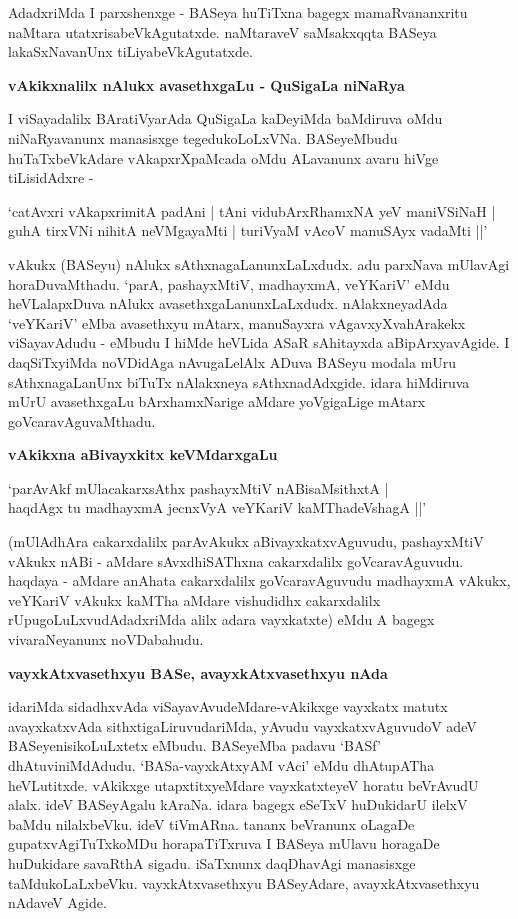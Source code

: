 AdadxriMda I parxshenxge - BASeya huTiTxna bagegx mamaRvananxritu naMtara utatxrisa\-beVkAgutatxde. naMta\-raveV saMsakxqqta BASeya lakaSxNavanUnx tiLiyabeVkAgutatxde.

{\bigskip
\noindent
{\large\bf vAkikxnalilx nAlukx avasethxgaLu - QuSigaLa niNaRya}}\label{page8}
\medskip

\noindent
I viSayadalilx BAratiVyarAda QuSigaLa kaDeyiMda baMdiruva oMdu niNaRyavanunx mana\-sisxge tegedu\-koLoLxVNa. BASeyeMbudu huTaTxbeVkAdare vAkapxrXpaMcada oMdu ALavanunx avaru hiVge tiLisi\-dAdxre -

\begin{shloka}
`catAvxri vAkapxrimitA padAni | tAni vidubArxRhamxNA yeV maniVSiNaH |\\\label{1}
guhA tirxVNi nihitA neVMgayaMti | turiVyaM vAcoV manuSAyx vadaMti ||'
\end{shloka}

\noindent
vAkukx (BASeyu) nAlukx sAthxnagaLanunxLaLxdudx. adu parxNava mUlavAgi horaDuvaMthadu. `parA, pashayxMtiV, madhayxmA, veYKariV' eMdu heVLalapxDuva nAlukx avasethxgaLanunxLaLxdudx. nAlakxneyadAda `veYKariV' eMba avasethxyu mAtarx, manuSayxra vAgavxyXvahArakekx viSayavAdudu - eMbudu I hiMde heVLida ASaR sAhitayxda aBipArxyavAgide. I daqSiTxyiMda noVDidAga nAvugaLelAlx ADuva BASeyu modala mUru sAthxnagaLanUnx biTuTx nAlakxneya sAthxnadAdxgide. idara hiMdiruva mUrU avasethxgaLu bArxhamxNarige aMdare yoVgigaLige mAtarx goVcaravAguvaMthadu.

{\bigskip
\noindent
{\large\bf vAkikxna aBivayxkitx keVMdarxgaLu}}\label{page8}
\medskip

\begin{shloka}
`parAvAkf mUlacakarxsAthx pashayxMtiV nABisaMsithxtA |\\\label{8}
haqdAgx tu madhayxmA jecnxVyA veYKariV kaMThadeVshagA ||'
\end{shloka}

\noindent
(mUlAdhAra cakarxdalilx parAvAkukx aBivayxkatxvAguvudu, pashayxMtiV vAkukx nABi - aMdare sAvxdhi\-SAThxna cakarxdalilx goVcaravAguvudu. haqdaya - aMdare anAhata cakarxdalilx goVcaravAguvudu madhayxmA vAkukx, veYKariV vAkukx kaMTha aMdare vishudidhx cakarxdalilx rUpugoLuLxvudAdadxriMda alilx adara vayxkatxte) eMdu A bagegx vivaraNeyanunx noVDabahudu.

{\bigskip
\noindent
{\large\bf vayxkAtxvasethxyu BASe, avayxkAtxvasethxyu nAda}}\label{page8}
\medskip

\noindent
idariMda sidadhxvAda viSayavAvudeMdare-vAkikxge vayxkatx matutx avayxkatxvAda sithxtigaLiruvudariMda, yA\-vudu vayxkatxvAguvudoV adeV BASeyenisikoLuLxtetx eMbudu. BASeyeMba padavu `BASf' dhAtuvi\-niMdA\-dudu. `BASa-vayxkAtxyAM vAci' eMdu dhAtupATha heVLutitxde. vAkikxge utapxtitxyeMdare vayxkatxteyeV horatu beVrA\-vudU alalx. ideV BASeyAgalu kAraNa. idara bagegx eSeTxV huDukidarU ilelxV baMdu nilalxbeVku. ideV tiVmARna. tananx beVranunx oLagaDe gupatxvAgiTuTxkoMDu horapaTiTxruva I BASeya mUlavu horagaDe huDukidare savaRthA sigadu. iSaTxnunx daqDhavAgi manasisxge taMdukoLaLxbeVku. vayxkAtx\-vasethxyu BASeyAdare, avayxkAtxvasethxyu nAdaveV Agide.

